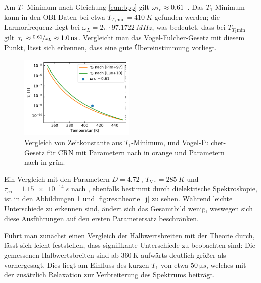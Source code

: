 Am $T_1$-Minimum nach Gleichung \eqref{eqn:bpp} gilt $\omega \tau_c \approx \SI{0.61}{}$ \cite[S. 629]{omegatau061}. Das $T_1$-Minimum kann in den OBI-Daten bei etwa $T_{T_1 \text{min}} = \SI{410}{K}$ gefunden werden; die Larmorfrequenz liegt bei $\omega_L = 2\pi \cdot \SI{97.1722}{MHz}$, was bedeutet, dass bei $T_{T_1 \text{min}}$ gilt $\tau_c \approx \sfrac{\SI{0.61}{}}{\omega_L} \approx \SI{1.0}{\nano s}$. Vergleicht man das Vogel-Fulcher-Gesetz mit diesem Punkt, lässt sich erkennen, dass eine gute Übereinstimmung vorliegt.

\begin{figure}
	\vspace{-20pt}
	\begin{center}
		\includegraphics[width=0.49\textwidth]{graphics/plot/vftau.pdf}
	\end{center}
	\vspace{-20pt}
	\caption{Vergleich von Zeitkonstante aus $T_1$-Minimum, und Vogel-Fulcher-Gesetz für CRN mit Parametern nach \cite{PIMENOV199793} in orange und Parametern nach \cite{crn_augsburg} in grün. \label{fig:korrelationszeiten}}
\end{figure}
Ein Vergleich mit den Parametern $D = \SI{4.72}{}$, $T_\text{VF} = \SI{285}{K}$ und $\tau_{co} = \SI{1.15e-14}{s}$ nach \cite{crn_augsburg}, ebenfalls bestimmt durch dielektrische Spektroskopie, ist in den Abbildungen \ref{fig:korrelationszeiten} und \ref{fig:res:theorie_j} zu sehen. Während leichte Unterschiede zu erkennen sind, ändert sich das Gesamtbild wenig, weswegen sich diese Ausführungen auf den ersten Parametersatz beschränken.




Führt man zunächst einen Vergleich der Halbwertsbreiten mit der Theorie durch, lässt sich leicht feststellen, dass signifikante Unterschiede zu beobachten sind: Die gemessenen Halbwertsbreiten sind ab $\SI{360}{\kelvin}$ aufwärts deutlich größer als vorhergesagt. Dies liegt am Einfluss des kurzen $T_1$ von etwa $\SI{50}{\micro s}$, welches mit der zusätzlich Relaxation zur Verbreiterung des Spektrums beiträgt.

